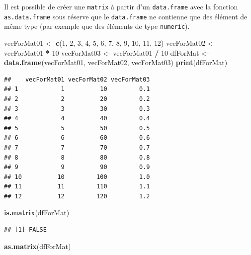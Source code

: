\documentclass[]{book}
\newenvironment{Shaded}{\begin{snugshade}}{\end{snugshade}}
\newcommand{\KeywordTok}[1]{\textcolor[rgb]{0.13,0.29,0.53}{\textbf{#1}}}
\newcommand{\DecValTok}[1]{\textcolor[rgb]{0.00,0.00,0.81}{#1}}
\newcommand{\StringTok}[1]{\textcolor[rgb]{0.31,0.60,0.02}{#1}}
\newcommand{\OperatorTok}[1]{\textcolor[rgb]{0.81,0.36,0.00}{\textbf{#1}}}
\newcommand{\NormalTok}[1]{#1}
\begin{document}
Il est possible de créer une \texttt{matrix} à partir d'un
\texttt{data.frame} avec la fonction \texttt{as.data.frame} sous réserve
que le \texttt{data.frame} ne contienne que des élément de même type
(par exemple que des éléments de type \texttt{numeric}).

\begin{Shaded}
\begin{Highlighting}[]
\NormalTok{vecForMat01 <-}\StringTok{ }\KeywordTok{c}\NormalTok{(}\DecValTok{1}\NormalTok{, }\DecValTok{2}\NormalTok{, }\DecValTok{3}\NormalTok{, }\DecValTok{4}\NormalTok{, }\DecValTok{5}\NormalTok{, }\DecValTok{6}\NormalTok{, }\DecValTok{7}\NormalTok{, }\DecValTok{8}\NormalTok{, }\DecValTok{9}\NormalTok{, }\DecValTok{10}\NormalTok{, }\DecValTok{11}\NormalTok{, }\DecValTok{12}\NormalTok{)}
\NormalTok{vecForMat02 <-}\StringTok{ }\NormalTok{vecForMat01 }\OperatorTok{*}\StringTok{ }\DecValTok{10}
\NormalTok{vecForMat03 <-}\StringTok{ }\NormalTok{vecForMat01 }\OperatorTok{/}\StringTok{ }\DecValTok{10}
\NormalTok{dfForMat <-}\StringTok{ }\KeywordTok{data.frame}\NormalTok{(vecForMat01, vecForMat02, vecForMat03)}
\KeywordTok{print}\NormalTok{(dfForMat)}
\end{Highlighting}
\end{Shaded}

\begin{verbatim}
##    vecForMat01 vecForMat02 vecForMat03
## 1            1          10         0.1
## 2            2          20         0.2
## 3            3          30         0.3
## 4            4          40         0.4
## 5            5          50         0.5
## 6            6          60         0.6
## 7            7          70         0.7
## 8            8          80         0.8
## 9            9          90         0.9
## 10          10         100         1.0
## 11          11         110         1.1
## 12          12         120         1.2
\end{verbatim}

\begin{Shaded}
\begin{Highlighting}[]
\KeywordTok{is.matrix}\NormalTok{(dfForMat)}
\end{Highlighting}
\end{Shaded}

\begin{verbatim}
## [1] FALSE
\end{verbatim}

\begin{Shaded}
\begin{Highlighting}[]
\KeywordTok{as.matrix}\NormalTok{(dfForMat)}
\end{Highlighting}
\end{Shaded}
\end{document}
